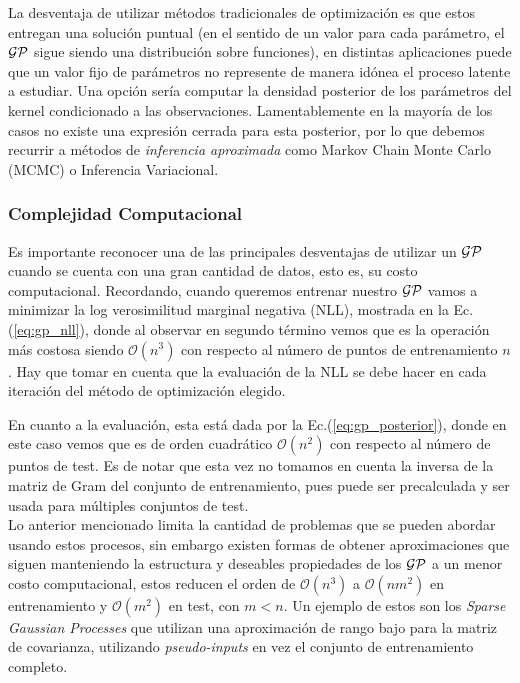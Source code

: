 La desventaja de utilizar métodos tradicionales de optimización es que estos entregan una solución puntual (en el sentido de un valor para cada parámetro, el $\mathcal{GP}$ sigue siendo una distribución sobre funciones), en distintas aplicaciones puede que un valor fijo de parámetros no represente de manera idónea el proceso latente a estudiar. Una opción sería computar la densidad posterior de los parámetros del kernel condicionado a las observaciones. Lamentablemente en la mayoría de los casos no existe una expresión cerrada para esta posterior, por lo que debemos recurrir a métodos de \textit{inferencia aproximada} como Markov Chain Monte Carlo (MCMC) o Inferencia Variacional.





\subsubsection{Complejidad Computacional}

Es importante reconocer una de las principales desventajas de utilizar un $\mathcal{GP}$ cuando se cuenta con una gran cantidad de datos, esto es, su costo computacional.
Recordando, cuando queremos entrenar nuestro $\mathcal{GP}$ vamos a minimizar la log verosimilitud marginal negativa (NLL), mostrada en la Ec.(\ref{eq:gp_nll}), donde al observar en segundo término vemos que es la operación más costosa siendo $\mathcal{O}(n^3)$ con respecto al número de puntos de entrenamiento $n$. Hay que tomar en cuenta que la evaluación de la NLL se debe hacer en cada iteración del método de optimización elegido.

En cuanto a la evaluación, esta está dada por la Ec.(\ref{eq:gp_posterior}), donde en este caso vemos que es de orden cuadrático $\mathcal{O}(n^2)$ con respecto al número de puntos de test. Es de notar que esta vez no tomamos en cuenta la inversa de la matriz de Gram del conjunto de entrenamiento, pues puede ser precalculada y ser usada para múltiples conjuntos de test.\\

Lo anterior mencionado limita la cantidad de problemas que se pueden abordar usando estos procesos, sin embargo existen formas de obtener aproximaciones que siguen manteniendo la estructura y deseables propiedades de los $\mathcal{GP}$ a un menor costo computacional, estos reducen el orden de $\mathcal{O}(n^3)$ a $\mathcal{O}(nm^2)$ en entrenamiento y $\mathcal{O}(m^2)$ en test, con $m<n$. Un ejemplo de estos son los \textit{Sparse Gaussian Processes} que utilizan una aproximación de rango bajo para la matriz de covarianza, utilizando \textit{pseudo-inputs} en vez el conjunto de entrenamiento completo.


